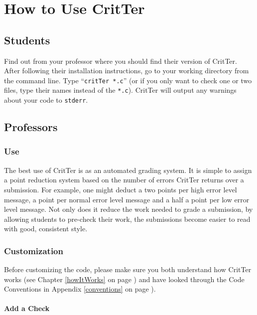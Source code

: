 \documentclass[12pt]{report}
\newcommand{\programName}{CritTer\xspace}
\begin{document}
\chapter{How to Use \programName}

\section{Students}
Find out from your professor where you should find their version of \programName. After following their installation instructions, go to your working directory 
from the command line. Type ``\lstinline{critTer *.c}'' (or if you only want to check one or two files, type 
their names instead of the \lstinline{*.c}).  \programName will output 
any warnings about your code to \lstinline{stderr}.

\section{Professors}

\subsection{Use}
The best use of \programName is as an automated grading system. It is simple to assign a point 
reduction system based on the number of errors \programName returns over a submission. For 
example, one might deduct a two points per high error level message, a point per normal error level 
message and a half a point per low error level message. Not only does it reduce the work needed to 
grade a submission, by allowing students to pre-check their work, the submissions become easier to 
read with good, consistent style.

\subsection{Customization}
Before customizing the code, please make sure you both understand how \programName works (see 
Chapter \ref{howItWorks} on page \pageref{howItWorks}) and have looked through the Code 
Conventions in Appendix \ref{conventions} on page \pageref{conventions}).

\subsubsection{Add a Check}
\end{document}
